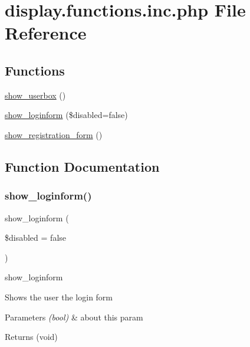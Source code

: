 \hypertarget{display_8functions_8inc_8php}{}\section{display.\+functions.\+inc.\+php File Reference}
\label{display_8functions_8inc_8php}
\subsection*{Functions}
\begin{DoxyCompactItemize}
\item 
\hyperlink{display_8functions_8inc_8php_a6ea4a1c3ccfe6b79dc5adc6e11ad2bf4}{show\+\_\+userbox} ()
\item 
\hyperlink{display_8functions_8inc_8php_aa8135e6270ca74a25a2deea01ab2ccd4}{show\+\_\+loginform} (\$disabled=false)
\item 
\hyperlink{display_8functions_8inc_8php_a1b0595a93d919969c541477d6c0b71ea}{show\+\_\+registration\+\_\+form} ()
\end{DoxyCompactItemize}


\subsection{Function Documentation}
\mbox{\label{display_8functions_8inc_8php_aa8135e6270ca74a25a2deea01ab2ccd4}} 
\subsubsection{\texorpdfstring{show\+\_\+loginform()}{show\_loginform()}}
{\footnotesize\ttfamily show\+\_\+loginform (\begin{DoxyParamCaption}\item[{}]{\$disabled = {\ttfamily false} }\end{DoxyParamCaption})}

show\+\_\+loginform

Shows the user the login form


\begin{DoxyParams}{Parameters}
{\em (bool)} & about this param \\
\hline
\end{DoxyParams}
\begin{DoxyReturn}{Returns}
(void) 
\end{DoxyReturn}
\mbox{\label{display_8functions_8inc_8php_a1b0595a93d919969c541477d6c0b71ea}} 
